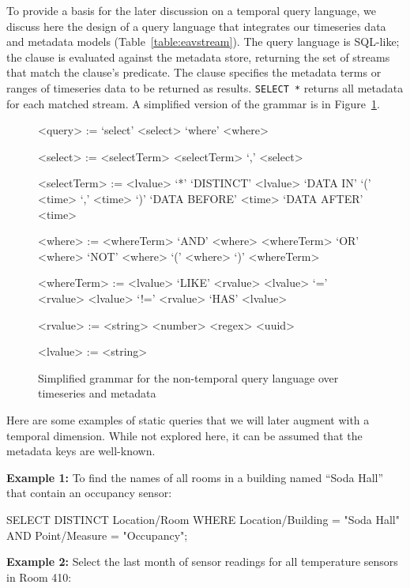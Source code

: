 To provide a basis for the later discussion on a temporal query language, we
discuss here the design of a query language that integrates our timeseries data
and metadata models (Table~\ref{table:eavstream}).  The query language is
SQL-like; the  clause is evaluated against the metadata store,
returning the set of streams that match the clause's predicate. The
 clause specifies the metadata terms or ranges of timeseries data
to be returned as results. \texttt{SELECT *} returns all metadata for each
matched stream.  A simplified version of the grammar is in
Figure~\ref{fig:nontemporalgrammar}.

\setlength{\grammarindent}{8em}
\setlength{\grammarparsep}{4pt}
\begin{figure}
\centering
\begin{grammar}
<query> := `select' <select> `where' <where>

<select> := <selectTerm>
\alt <selectTerm> `,' <select>

<selectTerm> := <lvalue>
\alt `*'
\alt `DISTINCT' <lvalue>
\alt `DATA IN' `(' <time> `,' <time> `)'
\alt `DATA BEFORE' <time>
\alt `DATA AFTER' <time>

<where> := <whereTerm> `AND' <where>
\alt <whereTerm> `OR' <where>
\alt `NOT' <where>
\alt `(' <where> `)'
\alt <whereTerm>

<whereTerm> := <lvalue> `LIKE' <rvalue>
\alt <lvalue> `=' <rvalue>
\alt <lvalue> `!=' <rvalue>
\alt `HAS' <lvalue>

<rvalue> := <string>
\alt <number>
\alt <regex>
\alt <uuid>

<lvalue> := <string>
\end{grammar}
\caption{Simplified grammar for the non-temporal query language over timeseries and metadata}
\label{fig:nontemporalgrammar}
\end{figure}

Here are some examples of static queries that we will later augment with a temporal dimension.
While not explored here, it can be assumed that the metadata keys are well-known.

\textbf{Example 1:}
To find the names of all rooms in a building named ``Soda Hall'' that contain an occupancy sensor:

\begin{sqlcode}
SELECT DISTINCT Location/Room WHERE
Location/Building = "Soda Hall" AND
Point/Measure = "Occupancy";
\end{sqlcode}

\textbf{Example 2:}
Select the last month of sensor readings for all temperature sensors in Room 410:

